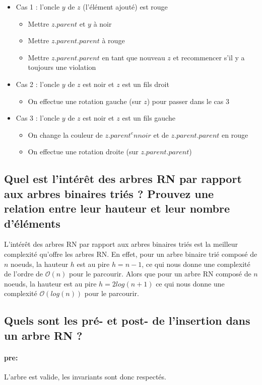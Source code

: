 \documentclass[11pt]{article}
\begin{document}
\begin{itemize}
	\item Cas 1 : l'oncle $y$ de $z$ (l'élément ajouté) est rouge
	\begin{itemize}
		\item Mettre $z.parent$ et $y$ à noir
		\item Mettre $z.parent.parent$ à rouge
		\item Mettre $z.parent.parent$ en tant que nouveau $z$ et recommencer s'il y a toujours une violation
	\end{itemize}
	\item Cas 2 : l'oncle $y$ de $z$ est noir et $z$ est un fils droit
	\begin{itemize}
		\item On effectue une rotation gauche (sur $z$) pour passer dans le cas 3
	\end{itemize}
	\item Cas 3 : l'oncle $y$ de $z$ est noir et $z$ est un fils gauche
	\begin{itemize}
		\item On change la couleur de $z.parent^en noir$ et de $z.parent.parent$ en rouge
		\item On effectue une rotation droite (sur $z.parent.parent$) 
	\end{itemize}
\end{itemize}

\subsection{Quel est l'intérêt des arbres RN par rapport aux arbres binaires triés ? Prouvez une relation entre leur hauteur et leur nombre d'éléments}

L'intérêt des arbres RN par rapport aux arbres binaires triés est la meilleur complexité qu'offre les arbres RN. En effet, pour un arbre binaire trié composé de $n$ noeuds, la hauteur $h$ est au pire $h = n - 1$, ce qui nous donne une complexité de l'ordre de $\mathcal{O}(n)$ pour le parcourir. Alors que pour un arbre RN composé de $n$ noeuds, la hauteur est au pire $h = 2log(n + 1)$ ce qui nous donne une complexité $\mathcal{O}(log(n))$ pour le parcourir.

\subsection{Quels sont les pré- et post- de l'insertion dans un arbre RN ?}

\paragraph{pre:} L'arbre est valide, les invariants sont donc respectés.
\end{document}
